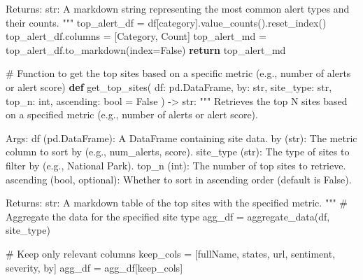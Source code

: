 \documentclass[
  letterpaper,
  DIV=11,
  numbers=noendperiod]{scrartcl}
\newenvironment{Shaded}{\begin{snugshade}}{\end{snugshade}}
\newcommand{\BuiltInTok}[1]{\textcolor[rgb]{0.00,0.23,0.31}{#1}}
\newcommand{\CommentTok}[1]{\textcolor[rgb]{0.37,0.37,0.37}{#1}}
\newcommand{\ControlFlowTok}[1]{\textcolor[rgb]{0.00,0.23,0.31}{\textbf{#1}}}
\newcommand{\KeywordTok}[1]{\textcolor[rgb]{0.00,0.23,0.31}{\textbf{#1}}}
\newcommand{\NormalTok}[1]{\textcolor[rgb]{0.00,0.23,0.31}{#1}}
\newcommand{\OperatorTok}[1]{\textcolor[rgb]{0.37,0.37,0.37}{#1}}
\newcommand{\StringTok}[1]{\textcolor[rgb]{0.13,0.47,0.30}{#1}}
\newcommand{\VariableTok}[1]{\textcolor[rgb]{0.07,0.07,0.07}{#1}}
\begin{document}
\begin{Shaded}
\begin{Highlighting}[]
\CommentTok{    Returns:}
\CommentTok{        str: A markdown string representing the most common alert types and their counts.}
\CommentTok{    """}
\NormalTok{    top\_alert\_df }\OperatorTok{=}\NormalTok{ df[}\StringTok{\textquotesingle{}category\textquotesingle{}}\NormalTok{].value\_counts().reset\_index()}
\NormalTok{    top\_alert\_df.columns }\OperatorTok{=}\NormalTok{ [}\StringTok{\textquotesingle{}Category\textquotesingle{}}\NormalTok{, }\StringTok{\textquotesingle{}Count\textquotesingle{}}\NormalTok{]}
\NormalTok{    top\_alert\_md }\OperatorTok{=}\NormalTok{ top\_alert\_df.to\_markdown(index}\OperatorTok{=}\VariableTok{False}\NormalTok{)}
    \ControlFlowTok{return}\NormalTok{ top\_alert\_md}

\CommentTok{\# Function to get the top sites based on a specific metric (e.g., number of alerts or alert score)}
\KeywordTok{def}\NormalTok{ get\_top\_sites(}
\NormalTok{        df: pd.DataFrame,}
\NormalTok{        by: }\BuiltInTok{str}\NormalTok{,}
\NormalTok{        site\_type: }\BuiltInTok{str}\NormalTok{,}
\NormalTok{        top\_n: }\BuiltInTok{int}\NormalTok{,}
\NormalTok{        ascending: }\BuiltInTok{bool} \OperatorTok{=} \VariableTok{False}
\NormalTok{    ) }\OperatorTok{{-}\textgreater{}} \BuiltInTok{str}\NormalTok{:}
    \CommentTok{"""}
\CommentTok{    Retrieves the top N sites based on a specified metric (e.g., number of alerts or alert score).}

\CommentTok{    Args:}
\CommentTok{        df (pd.DataFrame): A DataFrame containing site data.}
\CommentTok{        by (str): The metric column to sort by (e.g., \textquotesingle{}num\_alerts\textquotesingle{}, \textquotesingle{}score\textquotesingle{}).}
\CommentTok{        site\_type (str): The type of sites to filter by (e.g., \textquotesingle{}National Park\textquotesingle{}).}
\CommentTok{        top\_n (int): The number of top sites to retrieve.}
\CommentTok{        ascending (bool, optional): Whether to sort in ascending order (default is False).}

\CommentTok{    Returns:}
\CommentTok{        str: A markdown table of the top sites with the specified metric.}
\CommentTok{    """}
    \CommentTok{\# Aggregate the data for the specified site type}
\NormalTok{    agg\_df }\OperatorTok{=}\NormalTok{ aggregate\_data(df, site\_type)}

    \CommentTok{\# Keep only relevant columns}
\NormalTok{    keep\_cols }\OperatorTok{=}\NormalTok{ [}\StringTok{\textquotesingle{}fullName\textquotesingle{}}\NormalTok{, }\StringTok{\textquotesingle{}states\textquotesingle{}}\NormalTok{, }\StringTok{\textquotesingle{}url\textquotesingle{}}\NormalTok{, }\StringTok{\textquotesingle{}sentiment\textquotesingle{}}\NormalTok{, }\StringTok{\textquotesingle{}severity\textquotesingle{}}\NormalTok{, by]}
\NormalTok{    agg\_df }\OperatorTok{=}\NormalTok{ agg\_df[keep\_cols]}


\end{Highlighting}
\end{Shaded}
\end{document}
